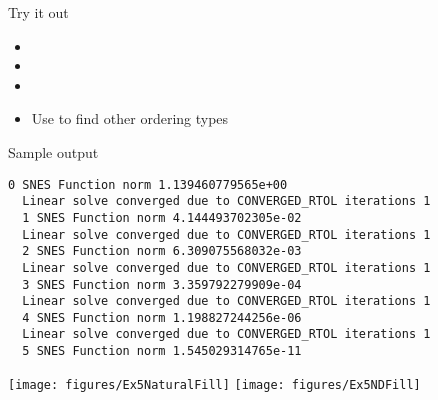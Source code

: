 \begin{frame}{Try it out}
   \\
  \begin{itemize}
  \item {}
  \item {}
  \item {}
  \item Use  to find other ordering types
\end{itemize}
\end{frame}

\begin{frame}[fragile]{Sample output}
\begin{Verbatim}[formatcom=\footnotesize]
  0 SNES Function norm 1.139460779565e+00
  Linear solve converged due to CONVERGED_RTOL iterations 1
  1 SNES Function norm 4.144493702305e-02
  Linear solve converged due to CONVERGED_RTOL iterations 1
  2 SNES Function norm 6.309075568032e-03
  Linear solve converged due to CONVERGED_RTOL iterations 1
  3 SNES Function norm 3.359792279909e-04
  Linear solve converged due to CONVERGED_RTOL iterations 1
  4 SNES Function norm 1.198827244256e-06
  Linear solve converged due to CONVERGED_RTOL iterations 1
  5 SNES Function norm 1.545029314765e-11
\end{Verbatim}
\vspace{-1em}
\texttt{[image: figures/Ex5NaturalFill]}
\texttt{[image: figures/Ex5NDFill]}
\end{frame}

